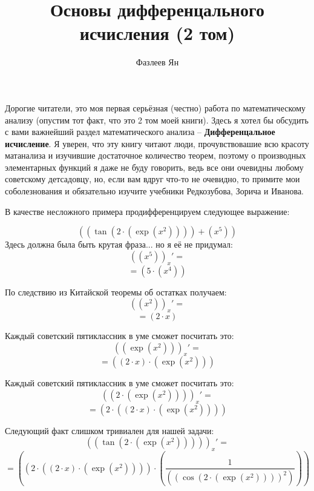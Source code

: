 \documentclass[12pt, a4paper]{article}
\title{Основы дифференцального исчисления (2 том)}
\author{Фазлеев Ян}
\begin{document}
\maketitle
\setlength{\parindent}{0pt}
\large

\hspace{1cm}Дорогие читатели, это моя первая серьёзная (честно) работа по математическому анализу (опустим тот факт, что это 2 том моей книги). Здесь я хотел бы обсудить с вами важнейший раздел математического анализа -- \textbf{Дифференцальное исчисление}. Я уверен, что эту книгу читают люди, прочувствовашие всю красоту матанализа и изучившие достаточное количество теорем, поэтому о производных элементарных функций я даже не буду говорить, ведь все они очевидны любому советскому детсадовцу, но, если вам вдруг что-то не очевидно, то примите мои соболезнования и обязательно изучите учебники Редкозубова, Зорича и Иванова.\vspace{0.5cm}

\hspace{1cm}В качестве несложного примера продифференцируем следующее выражение:

$$  (  {  (  \tan  (  {  {  2}  }  \cdot {  (  \exp  (  {  {x}  }  ^  {  {  2}  }  )  )  }  )  )  }  +  {  (  {  {x}  }  ^  {  {  5}  }  )  }  )  $$
\hspace{1cm}Здесь должна была быть крутая фраза... но я её не придумал:
$$ ( (  {  {x}  }  ^  {  {  5}  }  ) )_{x}' = $$
$$ =  (  {  {  5}  }  \cdot {  (  {  {x}  }  ^  {  {  4}  }  )  }  )  $$

\hspace{1cm}По следствию из Китайской теоремы об остатках получаем:
$$ ( (  {  {x}  }  ^  {  {  2}  }  ) )_{x}' = $$
$$ =  (  {  {  2}  }  \cdot {  {x}  }  )  $$

\hspace{1cm}Каждый советский пятиклассник в уме сможет посчитать это:
$$ ( (  \exp  (  {  {x}  }  ^  {  {  2}  }  )  ) )_{x}' = $$
$$ =  (  {  (  {  {  2}  }  \cdot {  {x}  }  )  }  \cdot {  (  \exp  (  {  {x}  }  ^  {  {  2}  }  )  )  }  )  $$

\hspace{1cm}Каждый советский пятиклассник в уме сможет посчитать это:
$$ ( (  {  {  2}  }  \cdot {  (  \exp  (  {  {x}  }  ^  {  {  2}  }  )  )  }  ) )_{x}' = $$
$$ =  (  {  {  2}  }  \cdot {  (  {  (  {  {  2}  }  \cdot {  {x}  }  )  }  \cdot {  (  \exp  (  {  {x}  }  ^  {  {  2}  }  )  )  }  )  }  )  $$

\hspace{1cm}Следующий факт слишком тривиален для нашей задачи:
$$ ( (  \tan  (  {  {  2}  }  \cdot {  (  \exp  (  {  {x}  }  ^  {  {  2}  }  )  )  }  )  ) )_{x}' = $$
$$ =  (  {  (  {  {  2}  }  \cdot {  (  {  (  {  {  2}  }  \cdot {  {x}  }  )  }  \cdot {  (  \exp  (  {  {x}  }  ^  {  {  2}  }  )  )  }  )  }  )  }  \cdot {  (  \frac {  {  1}  }  {  (  {  (  \cos  (  {  {  2}  }  \cdot {  (  \exp  (  {  {x}  }  ^  {  {  2}  }  )  )  }  )  )  }  ^  {  {  2}  }  )  }  )  }  )  $$
\end{document}
